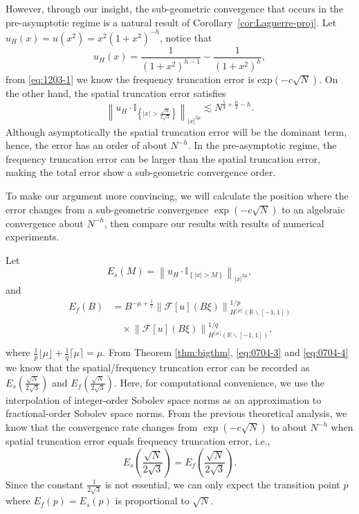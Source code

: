 \documentclass[pdflatex,sn-aps]{sn-jnl}%
\theoremstyle{thmstyleone}%
\theoremstyle{thmstyletwo}%
\theoremstyle{thmstylethree}%
\begin{document}
However, through our insight, the sub-geometric convergence that occurs in the pre-asymptotic regime is
a natural result of Corollary~\ref{cor:Laguerre-proj}.
Let $u_H(x) = u(x^2) = x^2 (1+x^2)^{-h}$, notice that
\begin{displaymath}
  u_H(x) = \frac{1}{(1+x^2)^{h-1}} - \frac{1}{(1+x^2)^h},
\end{displaymath}
from \eqref{eq:1203-1} we know the frequency
truncation error is exp$(-c\sqrt{N})$. On the other hand, the spatial truncation error satisfies
\begin{equation}\label{eq:0704-2}
  \left\|u_H \cdot \mathbb{I}_{\left\{|x|>\frac{\sqrt{N}}{2 \sqrt{3}} \right\}}\right\|_{|x|^{2\mu}} \lesssim  N^{\frac{5}{4}+\frac{\mu}{2}-h}.
\end{equation}
Although asymptotically the spatial truncation error will be the dominant term, hence, the error has an order of about $N^{-h}$. In the pre-asymptotic regime, the frequency truncation error can be larger than the spatial truncation error, making the total error show a sub-geometric convergence order.

To make our argument more convincing, we will calculate the position where the error changes from a sub-geometric convergence $\exp(-c\sqrt{N})$ to an algebraic convergence about $N^{-h}$, then compare our results
with results of numerical experiments.

Let
\begin{equation}\label{eq:0704-3}
  E_s(M) = \left\|u_H \cdot \mathbb{I}_{\left\{|x|>M\right\}}\right\|_{|x|^{2\mu}},
\end{equation}
and
\begin{equation}\label{eq:0704-4}
  \begin{aligned}
    E_f(B) & =B^{-\mu+\frac{1}{2}} \left\| \mathcal{F}[u]\left(B \xi\right) \right\|_{H^{\lfloor\mu\rfloor}\left(\mathbb{R}\backslash [-1,1]\right)}^{{1}/{p}} \\
    &\quad \times \left\| \mathcal{F}[u]\left(B \xi\right) \right\|_{H^{\lceil\mu\rceil}\left(\mathbb{R}\backslash [-1,1]\right)}^{{1}/{q}}, \\
  \end{aligned}
\end{equation}
where $\frac{1}{p} \lfloor\mu\rfloor + \frac{1}{q} \lceil\mu\rceil = \mu$.
From Theorem \ref{thm:bigthm}, \eqref{eq:0704-3} and \eqref{eq:0704-4} we know that the spatial/frequency
truncation error can be recorded as $E_s\left(\frac{\sqrt{N}}{2\sqrt{3}}\right)$ and
$E_f\left(\frac{\sqrt{N}}{2\sqrt{3}}\right)$. Here, for computational convenience, 
we use the interpolation of integer-order Sobolev space norms as an approximation to fractional-order Sobolev space norms.
From the previous theoretical analysis, we know that the convergence rate changes from $\exp(-c\sqrt{N})$ to about $N^{-h}$ when spatial truncation error equals frequency truncation error, i.e.,
\begin{equation}\label{eq:0704-5}
  E_s\left(\frac{\sqrt{N}}{2\sqrt{3}}\right) = E_f\left(\frac{\sqrt{N}}{2\sqrt{3}}\right).
\end{equation}
Since the constant $\frac{1}{2\sqrt{3}}$ is not essential, we can only expect the transition
point $p$ where $E_f(p) = E_s(p)$ is proportional to $\sqrt{N}$.
\end{document}
